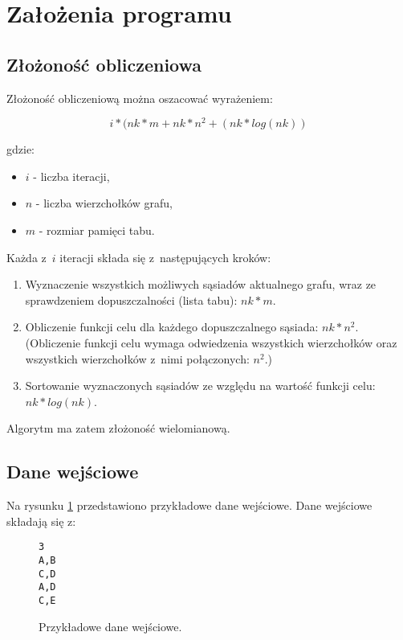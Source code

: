 \section{Założenia programu}

\subsection{Złożoność obliczeniowa}

Złożoność obliczeniową można oszacować wyrażeniem:

\begin{equation}
	i * (nk * m + nk * n^2 + (nk * log(nk))
\end{equation}

\noindent gdzie:

\begin{itemize}
 \item $i$ - liczba iteracji,
 \item $n$ - liczba wierzchołków grafu,
 \item $m$ - rozmiar pamięci tabu.
\end{itemize}

\noindent Każda z~$i$ iteracji składa się z~następujących kroków:

\begin{enumerate}
 \item Wyznaczenie wszystkich możliwych sąsiadów aktualnego grafu, wraz ze sprawdzeniem dopuszczalności (lista tabu): $nk * m$.
 \item Obliczenie funkcji celu dla każdego dopuszczalnego sąsiada: $nk * n^2$. (Obliczenie funkcji celu wymaga odwiedzenia wszystkich wierzchołków oraz wszystkich wierzchołków z~nimi połączonych: $n^2$.)
 \item Sortowanie wyznaczonych sąsiadów ze względu na wartość funkcji celu: $nk * log(nk)$.
\end{enumerate}

\noindent Algorytm ma zatem złożoność wielomianową. 

\subsection{Dane wejściowe}

Na rysunku \ref{fig:input_data} przedstawiono przykładowe dane wejściowe. Dane wejściowe składają się z:

\begin{figure}[ht!]
	\begin{Verbatim}[frame=single]
3
A,B
C,D
A,D
C,E 
	\end{Verbatim}
	\caption{Przykładowe dane wejściowe.}
	\label{fig:input_data}
\end{figure}

